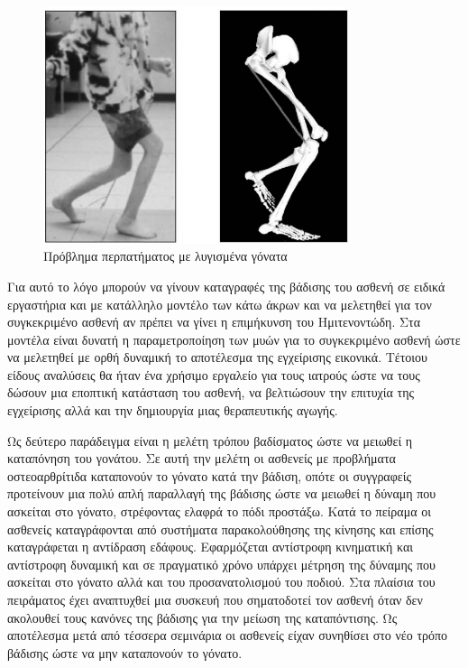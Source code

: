 \begin{figure}[H]
    \centering
    \includegraphics[width=0.8\textwidth]{fig/crouch-gait.png}
    \caption{Πρόβλημα περπατήματος με λυγισμένα γόνατα \cite{arnolda06}}
    \label{fig:crouch-gait}
\end{figure}

Για αυτό το λόγο μπορούν να γίνουν καταγραφές της βάδισης του ασθενή σε ειδικά εργαστήρια και με κατάλληλο μοντέλο των κάτω άκρων και να μελετηθεί για τον συγκεκριμένο ασθενή αν πρέπει να γίνει η επιμήκυνση του Ημιτενοντώδη. Στα μοντέλα είναι δυνατή η παραμετροποίηση των μυών για το συγκεκριμένο ασθενή ώστε να μελετηθεί με ορθή δυναμική το αποτέλεσμα της εγχείρισης εικονικά. Τέτοιου είδους αναλύσεις θα ήταν ένα χρήσιμο εργαλείο για τους ιατρούς ώστε να τους δώσουν μια εποπτική κατάσταση του ασθενή, να βελτιώσουν την επιτυχία της εγχείρισης αλλά και την δημιουργία μιας θεραπευτικής αγωγής.

Ως δεύτερο παράδειγμα \cite{fregly07} είναι η μελέτη τρόπου βαδίσματος ώστε να μειωθεί η καταπόνηση του γονάτου. Σε αυτή την μελέτη οι ασθενείς με προβλήματα οστεοαρθρίτιδα καταπονούν το γόνατο κατά την βάδιση, οπότε οι συγγραφείς προτείνουν μια πολύ απλή παραλλαγή της βάδισης ώστε να μειωθεί η δύναμη που ασκείται στο γόνατο, στρέφοντας ελαφρά το πόδι προστάξω. Κατά το πείραμα οι ασθενείς καταγράφονται από συστήματα παρακολούθησης της κίνησης και επίσης καταγράφεται η αντίδραση εδάφους. Εφαρμόζεται αντίστροφη κινηματική και αντίστροφη δυναμική και σε πραγματικό χρόνο υπάρχει μέτρηση της δύναμης που ασκείται στο γόνατο αλλά και του προσανατολισμού του ποδιού. Στα πλαίσια του πειράματος έχει αναπτυχθεί μια συσκευή που σηματοδοτεί τον ασθενή όταν δεν ακολουθεί τους κανόνες της βάδισης για την μείωση της καταπόντισης. Ως αποτέλεσμα μετά από τέσσερα σεμινάρια οι ασθενείς είχαν συνηθίσει στο νέο τρόπο βάδισης ώστε να μην καταπονούν το γόνατο.

